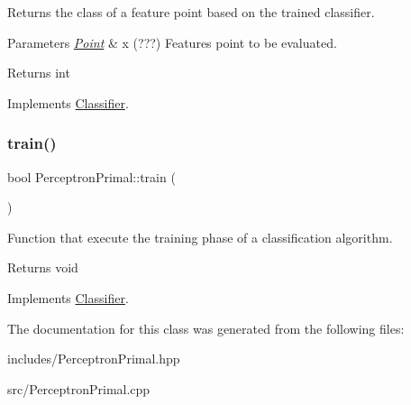 Returns the class of a feature point based on the trained classifier. 


\begin{DoxyParams}{Parameters}
{\em \hyperlink{class_point}{Point}} & x (???) Features point to be evaluated. \\
\hline
\end{DoxyParams}
\begin{DoxyReturn}{Returns}
int 
\end{DoxyReturn}


Implements \hyperlink{class_classifier_ae8e9554823b85ddc2dcad2955da811d9}{Classifier}.

\mbox{\label{class_perceptron_primal_a17f817a72fc7d61d1686ea77f7f9e84d}} 
\subsubsection{\texorpdfstring{train()}{train()}}
{\footnotesize\ttfamily bool Perceptron\+Primal\+::train (\begin{DoxyParamCaption}{ }\end{DoxyParamCaption})\hspace{0.3cm}{\ttfamily [virtual]}}



Function that execute the training phase of a classification algorithm. 

\begin{DoxyReturn}{Returns}
void 
\end{DoxyReturn}


Implements \hyperlink{class_classifier_a2306a5de27555ab093593ac9642bc7d9}{Classifier}.



The documentation for this class was generated from the following files\+:\begin{DoxyCompactItemize}
\item 
includes/Perceptron\+Primal.\+hpp\item 
src/Perceptron\+Primal.\+cpp\end{DoxyCompactItemize}
